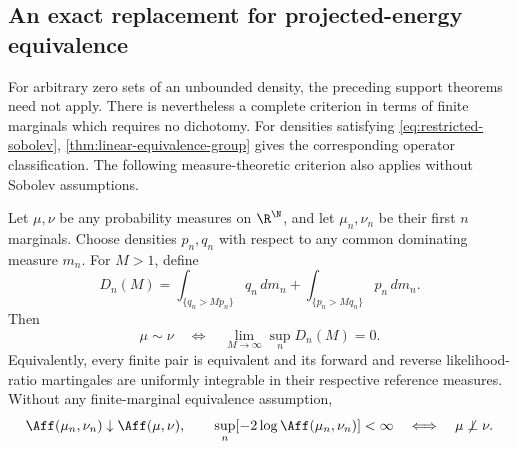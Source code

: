 \subsection{An exact replacement for projected-energy equivalence}
\label{sec:restricted-projections}

For arbitrary zero sets of an unbounded density, the preceding support
theorems need not apply.
There is nevertheless a complete criterion in terms of finite marginals
which requires no dichotomy.
For densities satisfying \eqref{eq:restricted-sobolev},
\cref{thm:linear-equivalence-group} gives the corresponding operator
classification.  The following measure-theoretic criterion also applies
without Sobolev assumptions.

\begin{proposition}
\label{prop:restricted-projected-criterion}
Let \(\mu,\nu\) be any probability measures on \(\R^\N\), and let
\(\mu_n,\nu_n\) be their first \(n\) marginals.
Choose densities \(p_n,q_n\) with respect to any common dominating
measure \(m_n\).
For \(M>1\), define
\[
 D_n(M)=
 \int_{\{q_n>Mp_n\}}q_n\,dm_n+
 \int_{\{p_n>Mq_n\}}p_n\,dm_n.
\]
Then
\begin{equation}
 \mu\sim\nu
 \quad\Longleftrightarrow\quad
 \lim_{M\to\infty}\sup_nD_n(M)=0.
 \label{eq:restricted-ui-criterion}
\end{equation}
Equivalently, every finite pair is equivalent and its forward and
reverse likelihood-ratio martingales are uniformly integrable in their
respective reference measures.
Without any finite-marginal equivalence assumption,
\begin{equation}
 \Aff(\mu_n,\nu_n)\downarrow\Aff(\mu,\nu),\qquad
 \sup_n[-2\log\Aff(\mu_n,\nu_n)]<\infty
     \quad\Longleftrightarrow\quad \mu\not\perp\nu.
 \label{eq:restricted-energy-only-overlap}
\end{equation}
\end{proposition}
